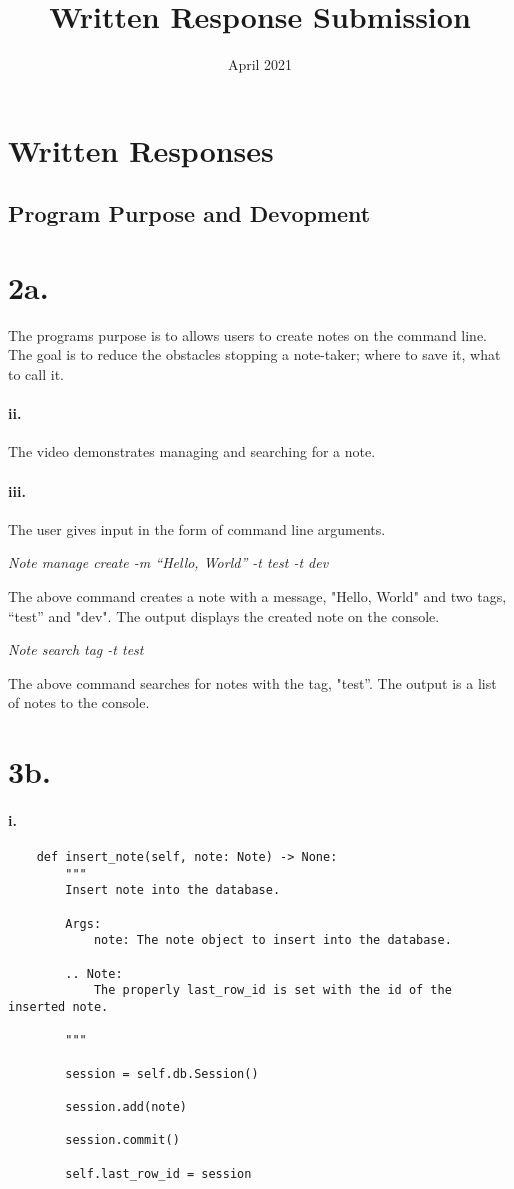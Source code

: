 \documentclass[12pt]{report}
\title{Written Response Submission}
\date{April 2021}
\begin{document}
\section{Written Responses}
\subsection{Program Purpose and Devopment}

\section{2a.}

The programs purpose is to allows users to create notes on the command line. The goal is to reduce the obstacles stopping a note-taker; where to save it, what to call it.

\paragraph{ii.}
The video demonstrates managing and searching for a note.

\paragraph{iii.}

The user gives input in the form of command line arguments.

\begin{center}
	\textit{Note manage create -m “Hello, World” -t test -t dev}
\end{center}

The above command creates a note with a message, "Hello, World" and two tags, “test” and "dev". The output displays the created note on the console.
\begin{center}
	\textit{Note search tag -t test}
\end{center}

The above command searches for notes with the tag, "test”. The output is a list of notes to the console.

\section{3b.}
\paragraph{i.}

\begin{lstlisting}
    def insert_note(self, note: Note) -> None:
        """
        Insert note into the database.

        Args:
            note: The note object to insert into the database.

        .. Note:
            The properly last_row_id is set with the id of the inserted note. 

        """

        session = self.db.Session()

        session.add(note)

        session.commit()

        self.last_row_id = session
\end{lstlisting}
\end{document}
